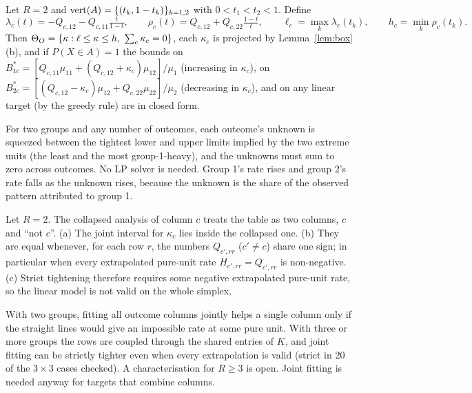 \begin{proposition}\label{prop:tworows}
Let $R=2$ and $\operatorname{vert}(A)=\{(t_k,1-t_k)\}_{k=1,2}$ with $0<t_1<t_2<1$. Define
\[
\lambda_c(t)=-Q_{c,12}-Q_{c,11}\tfrac{t}{1-t},\qquad
\rho_c(t)=Q_{c,12}+Q_{c,22}\tfrac{1-t}{t},\qquad
\ell_c=\max_k\lambda_c(t_k),\qquad h_c=\min_k\rho_c(t_k).
\]
Then $\ThO=\{\kappa:\ell\le\kappa\le h,\ \sum_c\kappa_c=0\}$, each $\kappa_c$ is
projected by Lemma~\ref{lem:box}(b), and if $P(X\in A)=1$ the bounds on
$B^*_{1c}=[Q_{c,11}\mu_{11}+(Q_{c,12}+\kappa_c)\mu_{12}]/\mu_1$ (increasing in
$\kappa_c$), on $B^*_{2c}=[(Q_{c,12}-\kappa_c)\mu_{12}+Q_{c,22}\mu_{22}]/\mu_2$
(decreasing in $\kappa_c$), and on any linear target (by the greedy rule) are in
closed form.
\end{proposition}
\begin{reading}
For two groups and any number of outcomes, each outcome's unknown is squeezed
between the tightest lower and upper limits implied by the two extreme units (the
least and the most group-1-heavy), and the unknowns must sum to zero across
outcomes. No LP solver is needed. Group 1's rate rises and group 2's rate falls
as the unknown rises, because the unknown is the share of the observed pattern
attributed to group 1.
\end{reading}

\begin{corollary}\label{cor:joint}
Let $R=2$. The collapsed analysis of column $c$ treats the table as two columns,
$c$ and ``not $c$''. (a) The joint interval for $\kappa_c$ lies inside the
collapsed one. (b) They are equal whenever, for each row $r$, the numbers
$Q_{c',rr}$ ($c'\neq c$) share one sign; in particular when every extrapolated
pure-unit rate $H_{c',rr}=Q_{c',rr}$ is non-negative. (c) Strict tightening
therefore requires some negative extrapolated pure-unit rate, so the linear model
is not valid on the whole simplex.
\end{corollary}
\begin{reading}
With two groups, fitting all outcome columns jointly helps a single column only if
the straight lines would give an impossible rate at some pure unit. With three or
more groups the rows are coupled through the shared entries of $K$, and joint
fitting can be strictly tighter even when every extrapolation is valid (strict
in 20 of the $3\times3$ cases checked). A characterisation for $R\ge3$ is open.
Joint fitting is needed anyway for targets that combine columns.
\end{reading}

